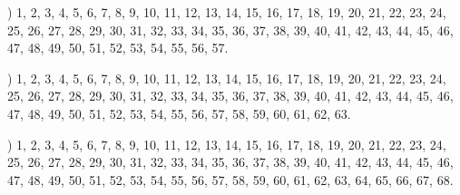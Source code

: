 \documentclass[a4paper,11pt]{article}
\begin{document}
\vspace{\spaceFour}



\noindent
{}) 1, 2, 3, 4, 5, 6, 7, 8, 9, 10, 11, 12, 13, 14, 15, 16,
17, 18, 19, 20, 21, 22, 23, 24, 25, 26, 27, 28, 29, 30, 31, 32, 33, 34,
35, 36, 37, 38, 39, 40, 41, 42, 43, 44, 45, 46, 47, 48, 49, 50, 51, 52,
53, 54, 55, 56, 57.

\vspace{\spaceFour}



\noindent
{}) 1, 2, 3, 4, 5, 6, 7, 8, 9, 10, 11, 12, 13, 14, 15, 16,
17, 18, 19, 20, 21, 22, 23, 24, 25, 26, 27, 28, 29, 30, 31, 32, 33, 34,
35, 36, 37, 38, 39, 40, 41, 42, 43, 44, 45, 46, 47, 48, 49, 50, 51, 52,
53, 54, 55, 56, 57, 58, 59, 60, 61, 62, 63.

\vspace{\spaceFour}



\noindent
{}) 1, 2, 3, 4, 5, 6, 7, 8, 9, 10, 11, 12, 13, 14, 15, 16,
17, 18, 19, 20, 21, 22, 23, 24, 25, 26, 27, 28, 29, 30, 31, 32, 33, 34,
35, 36, 37, 38, 39, 40, 41, 42, 43, 44, 45, 46, 47, 48, 49, 50, 51, 52,
53, 54, 55, 56, 57, 58, 59, 60, 61, 62, 63, 64, 65, 66, 67, 68.


\vspace{\spaceTwo}












{}






\end{document}
